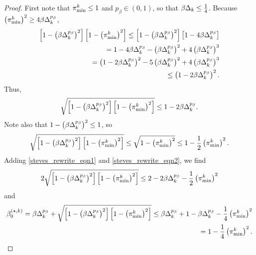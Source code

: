 

\begin{proof}

First note that ${\pi^k_{\textrm{min}}} \le 1$ and $p_{\beta} \in (0, 1)$, so that $\beta \Delta_k \le \frac 1 4$.
Because $\left({\pi^k_{\textrm{min}}}\right)^2 \ge 4\beta\Delta_k^{p_{\beta}}$,
\begin{align*}
    \left[1 - \left(\beta \Delta_k ^{p_{\beta}}\right)^2\right]\left[1 - \left({\pi^k_{\textrm{min}}} \right)^2\right]
\le \left[1 - \left(\beta \Delta_k ^{p_{\beta}}\right)^2\right]\left[1 - 4\beta \Delta_k^{p_{\beta}}\right] \\
= 1 - 4 \beta \Delta_k^{p_{\beta}} - \left(\beta \Delta_k^{p_{\beta}}\right)^2 + 4 \left(\beta \Delta_k^{p_{\beta}}\right)^3 \\
= \left(1 - 2 \beta \Delta_k^{p_{\beta}}\right)^2 - 5 \left(\beta\Delta_k^{p_{\beta}}\right)^2 + 4 \left(\beta \Delta_k^{p_{\beta}}\right)^3 \\
\le \left(1 - 2\beta\Delta_k^{p_{\beta}}\right)^2.
\end{align*}
Thus, 
\begin{align}
\label{steves_rewrite_eqn1}
\sqrt{\left[1 - \left(\beta \Delta_k ^{p_{\beta}}\right)^2\right]\left[1 - \left({\pi^k_{\textrm{min}}} \right)^2\right]} 
\le 1 - 2 \beta \Delta_k^{p_{\beta}}.
\end{align}
Note also that $1 - \left(\beta  \Delta_k ^{p_{\beta}}\right)^2 \le 1$, so
\begin{align}
\label{steves_rewrite_eqn2}
\sqrt{\left[1 - \left(\beta \Delta_k ^{p_{\beta}}\right)^2\right]\left[1 - \left({\pi^k_{\textrm{min}}} \right)^2\right]} 
\le \sqrt{1 - \left({\pi^k_{\textrm{min}}} \right)^2} \le 1 - \frac 1 2 \left({\pi^k_{\textrm{min}}} \right)^2.
\end{align}
Adding \cref{steves_rewrite_eqn1} and \cref{steves_rewrite_eqn2}, we find
\begin{align*}
2 \sqrt{\left[1 - \left(\beta \Delta_k ^{p_{\beta}}\right)^2\right]\left[1 - \left({\pi^k_{\textrm{min}}} \right)^2\right]} 
\le 2 - 2 \beta \Delta_k ^{p_{\beta}} - \frac 1 2 \left({\pi^k_{\textrm{min}}} \right)^2
\end{align*}
and
\begin{align*}
{\beta_0^{(\star, k)}} = \beta \Delta_k ^{p_{\beta}} + \sqrt{\left[1 - \left(\beta \Delta_k ^{p_{\beta}}\right)^2\right]\left[1 - \left({\pi^k_{\textrm{min}}} \right)^2\right]}
\le \beta \Delta_k ^{p_{\beta}} + 1 - \beta \Delta_k ^{p_{\beta}} - \frac 1 4 \left({\pi^k_{\textrm{min}}} \right)^2 \\
= 1 - \frac 1 4 \left({\pi^k_{\textrm{min}}} \right)^2.
\end{align*}
\end{proof}

